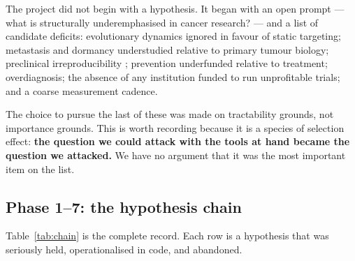 \documentclass[11pt,a4paper]{article}
\begin{document}
The project did not begin with a hypothesis. It began with an open prompt --- what is
structurally underemphasised in cancer research? --- and a list of candidate deficits:
evolutionary dynamics ignored in favour of static targeting; metastasis and dormancy
understudied relative to primary tumour biology; preclinical irreproducibility
\citep{errington2021investigating,begley2012raise}; prevention underfunded relative to
treatment; overdiagnosis; the absence of any institution funded to run unprofitable
trials; and a coarse measurement cadence.

The choice to pursue the last of these was made on tractability grounds, not importance
grounds. This is worth recording because it is a species of selection effect: \textbf{the
question we could attack with the tools at hand became the question we attacked.} We
have no argument that it was the most important item on the list.

\subsection{Phase 1--7: the hypothesis chain}

Table~\ref{tab:chain} is the complete record. Each row is a hypothesis that was
seriously held, operationalised in code, and abandoned.
\end{document}
